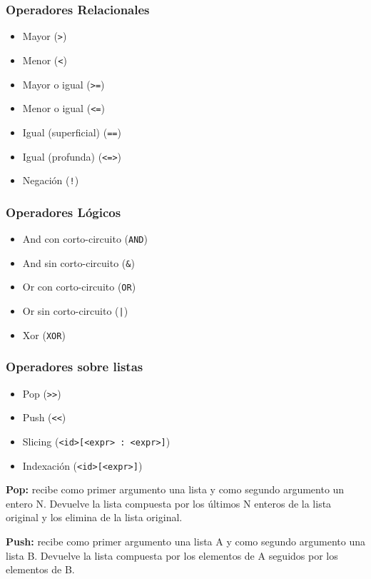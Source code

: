 \documentclass[12pt, spanish]{report}
\begin{document}
\subsubsection{Operadores Relacionales}
\begin{itemize}
\item Mayor         (\texttt{>})
\item Menor         (\texttt{<})
\item Mayor o igual (\texttt{>=})
\item Menor o igual (\texttt{<=})
\item Igual (superficial) (\texttt{==})
\item Igual (profunda)    (\texttt{<=>})
\item Negaci\'on      (\texttt{!})
\end{itemize}

\subsubsection{Operadores L\'ogicos}
\begin{itemize}
\item And con corto-circuito (\texttt{AND})
\item And sin corto-circuito (\texttt{\&})
\item Or con corto-circuito  (\texttt{OR})
\item Or sin corto-circuito  (\texttt{|})
\item Xor (\texttt{XOR})
\end{itemize}

\subsubsection{Operadores sobre listas}
\begin{itemize}
\item Pop          (\texttt{\textgreater \textgreater})
\item Push         (\texttt{\textless \textless})
\item Slicing      (\texttt{<id>[<expr> : <expr>]})
\item Indexaci\'on (\texttt{<id>[<expr>]})
\end{itemize}

\textbf{Pop:} recibe como primer argumento una lista y como segundo
argumento un entero N. Devuelve la lista compuesta por los \'ultimos N
enteros de la lista original y los elimina de la lista original.

\textbf{Push:} recibe como primer argumento una lista A y como segundo
argumento una lista B. Devuelve la lista compuesta por los elementos de
A seguidos por los elementos de B.
\end{document}
